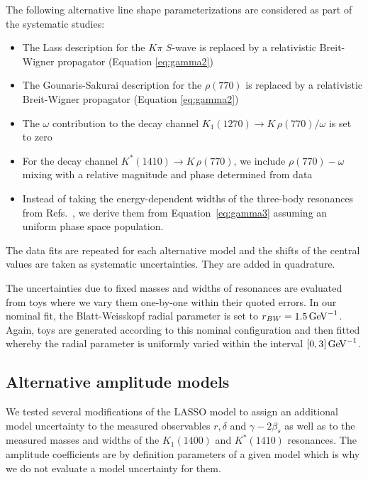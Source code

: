 The following alternative line shape parameterizations are considered as part of the systematic studies:
\begin{itemize}

	\item The Lass description for the $K\pi$ $S$-wave is replaced by a relativistic Breit-Wigner propagator (Equation \ref{eq:gamma2})
	\item The Gounaris-Sakurai description for the $\rho(770)$ is replaced by a relativistic Breit-Wigner propagator (Equation \ref{eq:gamma2})
	\item The $\omega$ contribution to the decay channel $K_1(1270) \to K \, \rho(770)/\omega$ is set to zero
	\item For the decay channel $K^{*}(1410) \to K \, \rho(770)$, we include $\rho(770)-\omega$ mixing with a relative magnitude and phase determined from data
	\item Instead of taking the energy-dependent widths of the three-body resonances from Refs.~\cite{dArgent:2017gzv,Aaij:2017kbo}, we derive them from Equation~\ref{eq:gamma3} assuming an uniform phase space population. 

\end{itemize}
The data fits are repeated for each alternative model and the shifts of the central values are taken as systematic uncertainties. They are added in quadrature.

The uncertainties due to fixed masses and widths of resonances are evaluated
from toys where we vary them one-by-one within their quoted errors. 
In our nominal fit, the Blatt-Weisskopf radial parameter is set to $r_{BW}=1.5 \mathrm{\,Ge\kern -0.1em V}^{-1}$. 
Again, toys are generated according to this nominal configuration 
and then fitted whereby the radial parameter is uniformly varied within the interval $[0,3] \mathrm{\,Ge\kern -0.1em V}^{-1}$.


\subsection{Alternative amplitude models}

We tested several modifications of the LASSO model to assign an additional model uncertainty to the measured observables $r,\delta$ and $\gamma-2\beta_s$ as well as to 
the measured masses and widths of the $K_1(1400)$ and $K^*(1410)$ resonances.
The amplitude coefficients are by definition parameters of a given model which is why we do not evaluate a model uncertainty for them.
	

